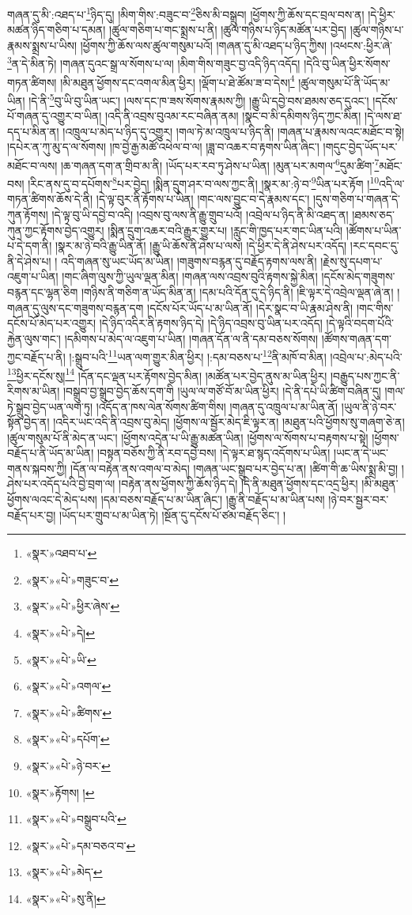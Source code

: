 གཞན་དུ་མི་:འཐད་པ་\footnote{«སྣར་»འཐབ་པ་}ཉིད་དུ། །མིག་གིས་:བཟུང་བ་\footnote{«སྣར་»«པེ་»གཟུང་བ་}ཅིས་མི་བསྒྲུབ། །ཕྱོགས་ཀྱི་ཆོས་དང་བྲལ་བས་ན། །དེ་ཕྱིར་མཚན་ཉིད་གཅིག་པ་དམན། །ཚུལ་གཅིག་པ་གང་སྨྲས་པ་ནི། །ཚུལ་གཉིས་པ་ཉིད་མཚོན་པར་བྱེད། །ཚུལ་གཉིས་པ་རྣམས་སྨྲས་པ་ཡིས། །ཕྱོགས་ཀྱི་ཆོས་ལས་ཚུལ་གསུམ་པའོ། །གཞན་དུ་མི་འཐད་པ་ཉིད་ཀྱིས། །འཕངས་:ཕྱིར་ཞེ་\footnote{«སྣར་»«པེ་»ཕྱིར་ཞེས་}ན་དེ་མིན་ཏེ། །གཞན་དུའང་སྒྲ་ལ་སོགས་པ་ལ། །མིག་གིས་གཟུང་བྱ་འདི་ཉིད་འདོད། །དེའི་བུ་ཡིན་ཕྱིར་སོགས་གཏན་ཚིགས། །མི་མཐུན་ཕྱོགས་དང་འགལ་མིན་ཕྱིར། །ལྡོག་པ་ཐེ་ཚོམ་ཟ་བ་དེས།\footnote{«སྣར་»«པེ་»དེ།} །ཚུལ་གསུམ་པོ་ནི་ཡོད་མ་ཡིན། །དེ་ནི་\footnote{«སྣར་»«པེ་»ཡི་}བུ་ཡི་བུ་ཡིན་ཡང་། །ལས་དང་ཁ་ཟས་སོགས་རྣམས་ཀྱི། །རྒྱུ་ཡི་དབྱེ་བས་ཐམས་ཅད་དུའང་། །དངོས་པོ་གཞན་དུ་འགྱུར་བ་ཡིན། །འདི་ནི་འབྲས་བུའམ་རང་བཞིན་ནམ། །སྣང་བ་མི་དམིགས་ཉིད་ཀྱང་མིན། །དེ་ལས་ཐ་དད་པ་མིན་ན། །འཁྲུལ་པ་མེད་པ་ཉིད་དུ་འགྱུར། །གལ་ཏེ་མ་འཁྲུལ་པ་ཉིད་ནི། །གཞན་པ་རྣམས་ལའང་མཐོང་བ་སྟེ། །དཔེར་ན་ཀུ་མུ་ད་ལ་སོགས། །ཁ་བྱེ་རྒྱ་མཚོ་འཕེལ་བ་ལ། །ཟླ་བ་འཆར་བ་རྟགས་ཡིན་ཞིང་། །གདུང་བྱེད་ཡོད་པར་མཐོང་བ་ལས། །ཆ་གཞན་དག་ན་གྲིབ་མ་ནི། །ཡོད་པར་རབ་ཏུ་ཤེས་པ་ཡིན། །མུན་པར་མགལ་\footnote{«སྣར་»«པེ་»འགལ་}དུམ་ཚིག་\footnote{«སྣར་»«པེ་»ཚིགས་}མཐོང་བས། །རིང་ནས་དུ་བ་དཔོགས་\footnote{«སྣར་»«པེ་»དཔོག་}པར་བྱེད། །སྨིན་དྲུག་ཤར་བ་ལས་ཀྱང་ནི། །སྣར་མ་:ཉེ་བ་\footnote{«སྣར་»«པེ་»ཉེ་བར་}ཡིན་པར་རྟོག །\footnote{«སྣར་»རྟོགས། །}འདི་ལ་གཏན་ཚིགས་ཆོས་དེ་ནི། །དེ་ལྟ་བུར་ནི་རྟོགས་པ་ཡིན། །གང་ལས་བྱུང་བ་དེ་རྣམས་དང་། །དུས་གཅིག་པ་གཞན་དེ་ཀུན་རྟོགས། །དེ་ལྟ་བུ་ཡི་དབྱེ་བ་འདི། །འབྲས་བུ་ལས་ནི་རྒྱུ་གྲུབ་པའོ། །འབྲེལ་པ་ཉིད་ནི་མི་འཐད་ན། །ཐམས་ཅད་ཀུན་ཀྱང་རྟོགས་བྱེད་འགྱུར། །སྨིན་དྲུག་འཆར་བའི་རྒྱུར་གྱུར་པ། །རླུང་གི་ཁྱད་པར་གང་ཡིན་པའི། །ཚོགས་པ་ཡིན་པ་དེ་དག་ནི། །སྣར་མ་ཉེ་བའི་རྒྱུ་ཡིན་ནོ། །རྒྱུ་ཡི་ཆོས་ནི་ཤེས་པ་ལས། །དེ་ཕྱིར་དེ་ནི་ཤེས་པར་འདོད། །རང་དབང་དུ་ནི་དེ་ཤེས་པ། །
འདི་གཞན་སུ་ཡང་ཡོད་མ་ཡིན། །གཟུགས་བརྙན་དུ་བརྗོད་རྟགས་ལས་ནི། །རྗེས་སུ་དཔག་པ་འཇུག་པ་ཡིན། །གང་ཞིག་ལུས་ཀྱི་ཡུལ་ལྡན་མིན། །གཞན་ལས་འབྲས་བུའི་རྟགས་སྐྱེ་མིན། །དངོས་མེད་གཟུགས་བརྙན་དང་ལྷན་ཅིག །གཉིས་ནི་གཅིག་ན་ཡོད་མིན་ན། །དམ་པའི་དོན་དུ་དེ་ཉིད་ནི། །ཇི་ལྟར་དེ་འབྲེལ་ལྡན་ཞེ་ན། །གཞན་དུ་ལུས་དང་གཟུགས་བརྙན་དག །དངོས་པོར་ཡོད་པ་མ་ཡིན་ནོ། །དེར་སྣང་བ་ཡི་རྣམ་ཤེས་ནི། །གང་གིས་དངོས་པོ་མེད་པར་འགྱུར། །དེ་ཉིད་འདིར་ནི་རྟགས་ཉིད་དེ། །དེ་ཉིད་འབྲས་བུ་ཡིན་པར་འདོད། །དེ་ལྟའི་བདག་པོའི་རྐྱེན་ལུས་གང་། །དམིགས་པ་མེད་ལ་འཇུག་པ་ཡིན། །གཞན་དོན་ལ་ནི་དམ་བཅས་སོགས། །ཚོགས་གཞན་དག་ཀྱང་བརྗོད་པ་ནི། །:སྒྲུབ་པའི་\footnote{«སྣར་»«པེ་»བསྒྲུབ་པའི་}ཡན་ལག་གྱུར་མིན་ཕྱིར། །:དམ་བཅས་པ་\footnote{«སྣར་»«པེ་»དམ་བཅའ་བ་}ནི་མཁོ་བ་མིན། །འབྲེལ་པ་:མེད་པའི་\footnote{«སྣར་»«པེ་»མེད་}ཕྱིར་དངོས་སུ།\footnote{«སྣར་»«པེ་»སུ་ནི།} །དོན་དང་ལྡན་པར་རྟོགས་བྱེད་མིན། །མཚོན་པར་བྱེད་ནུས་མ་ཡིན་ཕྱིར། །བརྒྱུད་པས་ཀྱང་ནི་རིགས་མ་ཡིན། །བསྒྲུབ་བྱ་སྒྲུབ་བྱེད་ཆོས་དག་གི །ཡུལ་ལ་གཙོ་བོ་མ་ཡིན་ཕྱིར། །དེ་ནི་དཔེ་ཡི་ཚིག་བཞིན་དུ། །གལ་ཏེ་སྒྲུབ་བྱེད་ཡན་ལག་ཏུ། །འདོད་ན་ཁས་ལེན་སོགས་ཚིག་གིས། །གཞན་དུ་འཁྲུལ་པ་མ་ཡིན་ནོ། །ཡུལ་ནི་ཉེ་བར་སྟོན་བྱེད་ན། །འདིར་ཡང་འདི་ནི་འབྲས་བུ་མེད། །ཕྱོགས་ལ་སྦྱོར་མེད་ཇི་ལྟར་ན། །མཐུན་པའི་ཕྱོགས་སུ་གཞག་ཅེ་ན། །ཚུལ་གསུམ་པོ་ནི་མེད་ན་ཡང་། །ཕྱོགས་འདྲེན་པ་ཡི་རྒྱུ་མཚན་ཡིན། །ཕྱོགས་ལ་སོགས་པ་བརྟགས་པ་སྟེ། །ཕྱོགས་བརྗོད་པ་ནི་ཡོད་མ་ཡིན། །བསྟན་བཅོས་ཀྱི་ནི་རབ་དབྱེ་བས། །དེ་ལྟར་ཐ་སྙད་འདོགས་པ་ཡིན། །ཡང་ན་དེ་ཡང་གནས་སྐབས་ཀྱི། །དོན་ལ་བརྟེན་ནས་འགལ་བ་མེད། །གཞན་ཡང་སྒྲུབ་པར་བྱེད་པ་ན། །ཚིག་གི་ཆ་ཡིས་སྨྲ་མི་བྱ། །ཤེས་པར་འདོད་པའི་བྱེ་བྲག་ལ། །བརྟེན་ནས་ཕྱོགས་ཀྱི་ཆོས་ཉིད་དེ། །དེ་ནི་མཐུན་ཕྱོགས་དང་འདྲ་ཕྱིར། །མི་མཐུན་ཕྱོགས་ལའང་དེ་མེད་པས། །དམ་བཅས་བརྗོད་པ་མ་ཡིན་ཞིང་། །རྒྱུ་ནི་བརྗོད་པ་མ་ཡིན་པས། །ཉེ་བར་སྦྱར་བར་བརྗོད་པར་བྱ། །ཡོད་པར་གྲུབ་པ་མ་ཡིན་ཏེ། །སྔོན་དུ་དངོས་པོ་ཙམ་བརྗོད་ཅིང་། །
